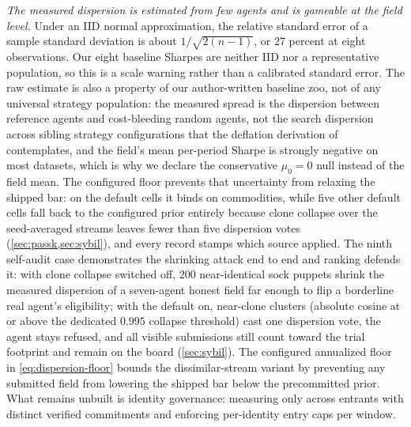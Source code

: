 \emph{The measured dispersion is estimated from few agents and is gameable at the field level.} Under an IID normal approximation, the relative standard error of a sample standard deviation is about $1/\sqrt{2(n-1)}$, or 27 percent at eight observations. Our eight baseline Sharpes are neither IID nor a representative population, so this is a scale warning rather than a calibrated standard error. The raw estimate is also a property of our author-written baseline zoo, not of any universal strategy population: the measured spread is the dispersion between reference agents and cost-bleeding random agents, not the search dispersion across sibling strategy configurations that the deflation derivation of \citet{bailey2014deflated} contemplates, and the field's mean per-period Sharpe is strongly negative on most datasets, which is why we declare the conservative $\mu_0 = 0$ null instead of the field mean. The configured floor prevents that uncertainty from relaxing the shipped bar: on the default cells it binds on commodities, while five other default cells fall back to the configured prior entirely because clone collapse over the seed-averaged streams leaves fewer than five dispersion votes (\cref{sec:passk,sec:sybil}), and every record stamps which source applied. The ninth self-audit case demonstrates the shrinking attack end to end and ranking defends it: with clone collapse switched off, 200 near-identical sock puppets shrink the measured dispersion of a seven-agent honest field far enough to flip a borderline real agent's eligibility; with the default on, near-clone clusters (absolute cosine at or above the dedicated $0.995$ collapse threshold) cast one dispersion vote, the agent stays refused, and all visible submissions still count toward the trial footprint and remain on the board (\cref{sec:sybil}). The configured annualized floor in \cref{eq:dispersion-floor} bounds the dissimilar-stream variant by preventing any submitted field from lowering the shipped bar below the precommitted prior. What remains unbuilt is identity governance: measuring only across entrants with distinct verified commitments and enforcing per-identity entry caps per window.

